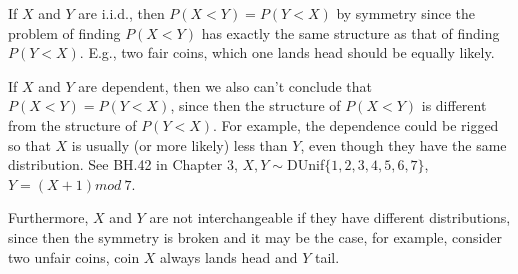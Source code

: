 

\setcounter{theorem}{49}
\begin{exercise}[BH.5.50]
\begin{solution}
    If $X$ and $Y$ are i.i.d., then $P(X<Y)=P(Y<X)$ by symmetry since the problem of finding $P(X < Y )$ has exactly the same structure as that of finding $P(Y < X)$. E.g., two fair coins, which one lands head should be equally likely.

	If $X$ and $Y$ are dependent, then we also can't conclude that $P(X<Y)=P(Y<X)$, since then the structure of $P(X<Y)$ is different from the structure of $P(Y<X)$. For example, the dependence could be rigged so that $X$ is usually (or more likely) less than $Y$, even though they have the same distribution. See BH.42 in Chapter 3, $X,Y\sim$DUnif$\{1,2,3,4,5,6,7\}$, $Y=(X+1) \textit{mod} ~7$.  
	
	Furthermore,  $X$ and $Y$ are not interchangeable if they have different distributions, since then the symmetry is broken and it may be the case, for example, consider two unfair coins, coin $X$ always lands head and $Y$ tail.
\end{solution}
\end{exercise}


